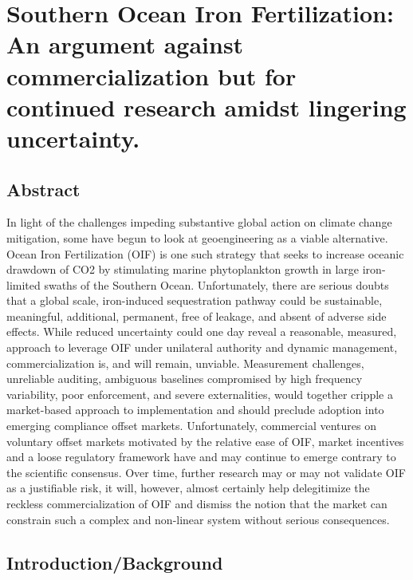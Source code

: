 \chapter{Southern Ocean Iron Fertilization: An argument against commercialization but for continued research amidst lingering uncertainty.
}
\label{chap:5}
\raggedbottom

\clearpage



\section{Abstract}

In light of the challenges impeding substantive global action on climate change mitigation, some have begun to look at geoengineering as a viable alternative. Ocean Iron Fertilization (OIF) is one such strategy that seeks to increase oceanic drawdown of CO2 by stimulating marine phytoplankton growth in large iron-limited swaths of the Southern Ocean. Unfortunately, there are serious doubts that a global scale, iron-induced sequestration pathway could be sustainable, meaningful, additional, permanent, free of leakage, and absent of adverse side effects. While reduced uncertainty could one day reveal a reasonable, measured, approach to leverage OIF under unilateral authority and dynamic management, commercialization is, and will remain, unviable. Measurement challenges, unreliable auditing, ambiguous baselines compromised by high frequency variability, poor enforcement, and severe externalities, would together cripple a market-based approach to implementation and should preclude adoption into emerging compliance offset markets. Unfortunately, commercial ventures on voluntary offset markets motivated by the relative ease of OIF, market incentives and a loose regulatory framework have and may continue to emerge contrary to the scientific consensus. Over time, further research may or may not validate OIF as a justifiable risk, it will, however, almost certainly help delegitimize the reckless commercialization of OIF and dismiss the notion that the market can constrain such a complex and non-linear system without serious consequences.


\section{Introduction/Background}


